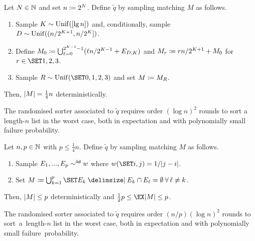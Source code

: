 \documentclass{article}
\begin{document}
\begin{thm}
\label{res:intro:par:n}
Let $N \in \mathbb{N}$ and set $n \coloneqq 2^N$.
Define $\tilde q$ by sampling matching $M$ as follows.

\begin{enumerate}%
	\item 
	Sample $K \sim \operatorname{Unif}([\lg n])$ and, conditionally, sample $D \sim \operatorname{Unif}( (n/2^{K+1}, n/2^K] )$.
	
	\item 
	Define $M_0 \coloneqq \bigcup_{\ell=0}^{2^{K-1}-1} (\ell n/2^{K-1} + E_{D,K})$ and $M_r \coloneqq r n/2^{K+1} + M_0$ for $r \in \set{1, 2, 3}$.
	
	\item 
	Sample $R \sim \Unif(\set{0, 1, 2, 3})$ and set $M \coloneqq M_R$.
\end{enumerate}
Then,
$| M | = \tfrac14 n$ deterministically.

The randomised sorter associated to $\tilde q$
requires order $(\log n)^2$ rounds to sort a length-$n$ list in the worst case,
both in expectation and with polynomially small failure probability.
\end{thm}


\begin{thm}
\label{res:intro:par:p}
Let $n, p \in \mathbb{N}$ with $p \le \tfrac14 n$.
Define $\tilde q$ by sampling matching $M$ as follows.

\begin{enumerate}%
	\item 
	Sample $E_1, ..., E_p \sim^{\textsf{iid}} w$ where $w(\set{i,j}) = 1/\abs{j - i}$.
	
	\item 
	Set $M \cq \bigcup_{k=1}^p \set{ E_k \given E_k \cap E_\ell = \emptyset \: \forall \, \ell \ne k }$.
\end{enumerate}
Then,
$| M | \le p$ deterministically and $\tfrac12 p \le \ex{\abs M} \le p$.

The randomised sorter associated to $\tilde q$
requires order $(n/p) (\log n)^2$ rounds to sort~a~length-$n$ list in the worst case,
both in expectation and with polynomially small failure~probability.
\end{thm}
\end{document}
